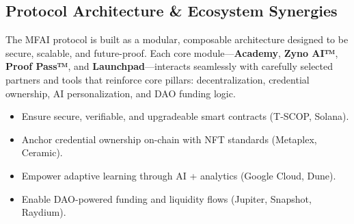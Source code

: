 \vspace{0.5cm}
\subsection{Protocol Architecture \& Ecosystem Synergies}

\noindent The MFAI protocol is built as a modular, composable architecture designed to be secure, scalable, and future-proof. Each core module—\textbf{Academy}, \textbf{Zyno AI™}, \textbf{Proof Pass™}, and \textbf{Launchpad}—interacts seamlessly with carefully selected partners and tools that reinforce core pillars: decentralization, credential ownership, AI personalization, and DAO funding logic.

\vspace{0.3cm}

\begin{tcolorbox}[colback=solana-purple!5!white, colframe=solana-purple, title=Strategic Integration Goals, fonttitle=\bfseries]
\begin{itemize}
    \item Ensure secure, verifiable, and upgradeable smart contracts (T-SCOP, Solana).
    \item Anchor credential ownership on-chain with NFT standards (Metaplex, Ceramic).
    \item Empower adaptive learning through AI + analytics (Google Cloud, Dune).
    \item Enable DAO-powered funding and liquidity flows (Jupiter, Snapshot, Raydium).
\end{itemize}
\end{tcolorbox}

\vspace{0.5cm}

